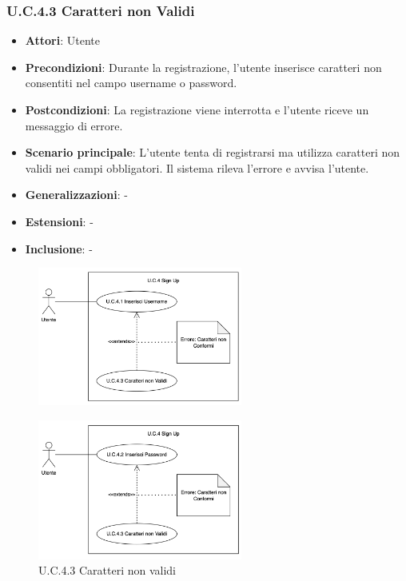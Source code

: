 \subsubsection{U.C.4.3 Caratteri non Validi}
\begin{itemize}
    \item \textbf{Attori}: Utente
    \item \textbf{Precondizioni}: Durante la registrazione, l'utente inserisce caratteri non consentiti nel campo username o password.
    \item \textbf{Postcondizioni}: La registrazione viene interrotta e l'utente riceve un messaggio di errore.
    \item \textbf{Scenario principale}: L'utente tenta di registrarsi ma utilizza caratteri non validi nei campi obbligatori. Il sistema rileva l'errore e avvisa l'utente.
    \item \textbf{Generalizzazioni}: -
    \item \textbf{Estensioni}: -
    \item \textbf{Inclusione}: -
\end{itemize}
\begin{figure}[H]
    \centering
    \includegraphics[width=0.6\textwidth]{img/U.C.4.3.1.png}
\end{figure}
\begin{figure}[H]
    \centering
    \includegraphics[width=0.6\textwidth]{img/U.C.4.3.2.png}
    \caption{U.C.4.3 Caratteri non validi }
\end{figure}
\newpage

